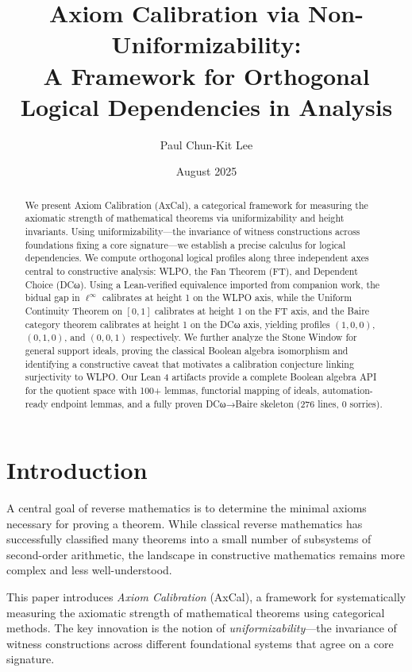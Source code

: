 \documentclass[11pt]{article}
\title{Axiom Calibration via Non-Uniformizability:\\
A Framework for Orthogonal Logical Dependencies in Analysis}
\author{Paul Chun-Kit Lee}
\date{August 2025}
\newcommand{\linf}{\ell^\infty}
\begin{document}
\maketitle

\begin{abstract}
We present Axiom Calibration (AxCal), a categorical framework for measuring the axiomatic strength of mathematical theorems via uniformizability and height invariants. Using uniformizability—the invariance of witness constructions across foundations fixing a core signature—we establish a precise calculus for logical dependencies. We compute orthogonal logical profiles along three independent axes central to constructive analysis: WLPO, the Fan Theorem (FT), and Dependent Choice (DCω). Using a Lean-verified equivalence imported from companion work, the bidual gap in $\linf$ calibrates at height 1 on the WLPO axis, while the Uniform Continuity Theorem on $[0,1]$ calibrates at height 1 on the FT axis, and the Baire category theorem calibrates at height 1 on the DCω axis, yielding profiles $(1,0,0)$, $(0,1,0)$, and $(0,0,1)$ respectively. We further analyze the Stone Window for general support ideals, proving the classical Boolean algebra isomorphism and identifying a constructive caveat that motivates a calibration conjecture linking surjectivity to WLPO. Our Lean 4 artifacts provide a complete Boolean algebra API for the quotient space with 100+ lemmas, functorial mapping of ideals, automation-ready endpoint lemmas, and a fully proven DCω→Baire skeleton (276 lines, 0 sorries).
\end{abstract}

\tableofcontents

\section{Introduction}

A central goal of reverse mathematics is to determine the minimal axioms necessary for proving a theorem. While classical reverse mathematics has successfully classified many theorems into a small number of subsystems of second-order arithmetic, the landscape in constructive mathematics remains more complex and less well-understood.

This paper introduces \emph{Axiom Calibration} (AxCal), a framework for systematically measuring the axiomatic strength of mathematical theorems using categorical methods. The key innovation is the notion of \emph{uniformizability}—the invariance of witness constructions across different foundational systems that agree on a core signature.
\end{document}
